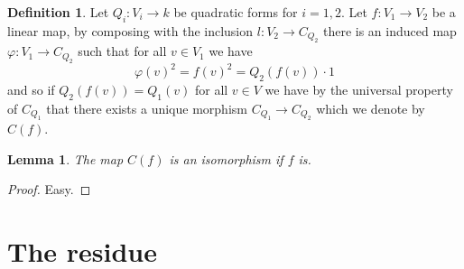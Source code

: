 \documentclass[12pt]{article}
\theoremstyle{plain}
\newtheorem{lemma}[thm]{Lemma}
\theoremstyle{definition}
\newtheorem{defn}[thm]{Definition} %
\newcommand{\lto}{\longrightarrow}
\begin{document}
\begin{defn}
	Let $Q_i: V_i \lto k$ be quadratic forms for $i = 1,2$. Let $f: V_1 \lto V_2$ be a linear map, by composing with the inclusion $l: V_2 \lto C_{Q_2}$ there is an induced map $\varphi: V_1 \lto C_{Q_2}$ such that for all $v \in V_1$ we have
	\begin{equation}
		\varphi(v)^2 = f(v)^2 = Q_2(f(v))\cdot 1
	\end{equation}
	and so if $Q_2(f(v)) = Q_1(v)$ for all $v \in V$ we have by the universal property of $C_{Q_1}$ that there exists a unique morphism $C_{Q_1} \lto C_{Q_2}$ which we denote by $C(f)$.
\end{defn}
\begin{lemma}
	The map $C(f)$ is an isomorphism if $f$ is.
\end{lemma}
\begin{proof}
	Easy.
\end{proof}



\section{The residue}
\end{document}
